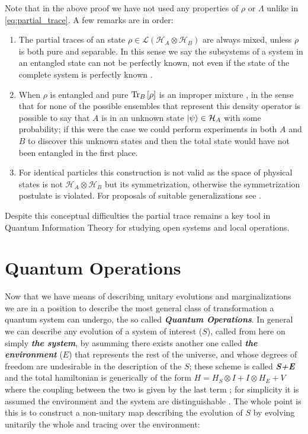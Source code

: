 Note that in the above proof we have not used any properties of $\rho$ or $\Lambda$ unlike in \eqref{eq:partial_trace}. A few remarks are
in order:
\begin{enumerate}
  \item The partial traces of an state $\rho \in \mathcal{L}(\mathcal{H}_{A}\otimes\mathcal{H}_{B})$ are always mixed, unless $\rho$ is
        both pure and separable. In this sense we say the subsystems of a system in an entangled state can not be perfectly known, not even if
        the state of the complete system is perfectly known \autocite{nielsen_quantum_2010, adesso2016introduction, diosi_short_2011}.
  \item When $\rho$ is entangled and pure $\mathrm{Tr}_{B}\left[\rho\right]$ is an improper mixture \cite{schlosshauer_decoherence_2007}, in the sense that for none of the possible ensembles that
        represent this density operator is possible to say that $A$ is in an unknown state $\ket{\psi} \in \mathcal{H}_{A}$  with some
        probability; if this were the case we could perform experiments in both $A$ and $B$ to discover this unknown states and then the total
        state would have not been entangled in the first place.
  \item For identical particles this construction is not valid as the space of physical states is not $\mathcal{H}_{A}\otimes \mathcal{H}_{B}$
        but its symmetrization, otherwise the symmetrization postulate is violated.
        For proposals of suitable generalizations see \cite{reyes-lega_aspects_2015}.
\end{enumerate}
Despite this conceptual difficulties the partial trace remains a key tool in Quantum Information Theory for studying open systems and
local operations.
\section{Quantum Operations}
Now that we have means of describing unitary evolutions and marginalizations we are in a position to describe the most general class
of transformation a quantum system can undergo, the so called \textbf{\textit{Quantum Operations}}. In general we can describe any
evolution of a system of interest ($S$), called from here on simply \textbf{\textit{the system}}, by asumming there exists another one called
\textbf{\textit{the environment}} ($E$) that represents the rest of the universe, and whose degrees of freedom are undesirable in the
description of the $S$; these scheme is called \textit{\textbf{S+E}} and the total hamiltonian is generically of the form
$H = H_{S}\otimes I + I\otimes H_{E} + V$ where the coupling between the two is given by the last term \cite{wiseman_quantum_2010};
for simplicity it is assumed the environment and the system are distinguishable \cite{breuer2002theory}. The whole point is this
is to construct a non-unitary map describing the evolution of $S$ by evolving unitarily the whole and tracing over the environment:

